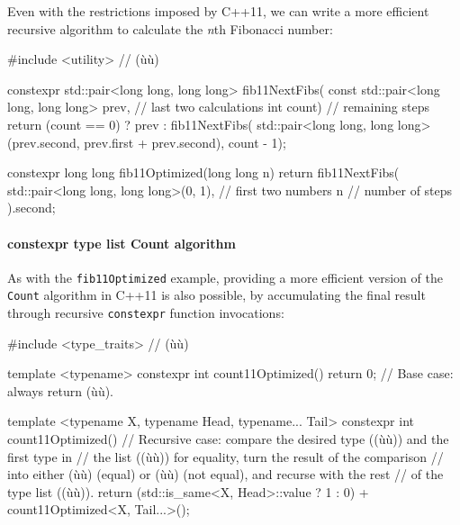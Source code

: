 Even with the restrictions imposed by C++11, we can write a
more efficient recursive algorithm to calculate the \emph{n\/}th
Fibonacci number:

\begin{emcppslisting}
#include <utility>  // (ù{}ù)

constexpr std::pair<long long, long long> fib11NextFibs(
    const std::pair<long long, long long> prev,  // last two calculations
    int count)                                   // remaining steps
{
    return (count == 0) ? prev : fib11NextFibs(
        std::pair<long long, long long>(prev.second,
                                        prev.first + prev.second),
        count - 1);
}

constexpr long long fib11Optimized(long long n)
{
    return fib11NextFibs(
        std::pair<long long, long long>(0, 1), // first two numbers
        n                                      // number of steps
    ).second;
}
\end{emcppslisting}
    

\paragraph[\lstinline!constexpr! type list \lstinline!Count! algorithm]{{\ParaCode constexpr} type list {\ParaCode Count} algorithm}\label{constexpr-typelist-count-algorithm}

As with the \lstinline!fib11Optimized! example, providing a more efficient version of the \lstinline!Count! algorithm in
C++11 is also possible, by accumulating the final result through recursive
\lstinline!constexpr! function invocations:

\begin{emcppslisting}
#include <type_traits>  // (ù{}ù)

template <typename>
constexpr int count11Optimized() { return 0; }
    // Base case: always return (ù{}ù).

template <typename X, typename Head, typename... Tail>
constexpr int count11Optimized()
    // Recursive case: compare the desired type ((ù{}ù)) and the first type in
    // the list ((ù{}ù)) for equality, turn the result of the comparison
    // into either (ù{}ù) (equal) or (ù{}ù) (not equal), and recurse with the rest
    // of the type list ((ù{}ù)).
{
    return (std::is_same<X, Head>::value ? 1 : 0)
        + count11Optimized<X, Tail...>();
}
\end{emcppslisting}
    
